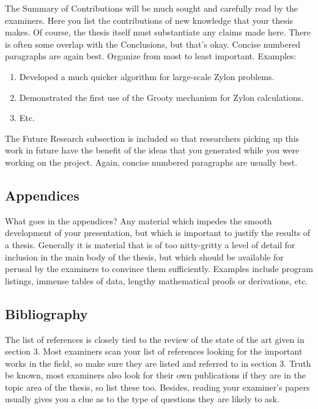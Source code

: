 The Summary of Contributions will be much sought and carefully read by the examiners. Here you list the contributions of new knowledge that your thesis makes. Of course, the thesis itself must substantiate any claims made here. There is often some overlap with the Conclusions, but that's okay. Concise numbered paragraphs are again best. Organize from most to least important. Examples:

\begin{enumerate}
	\item Developed a much quicker algorithm for large-scale Zylon problems.
	\item Demonstrated the first use of the Grooty mechanism for Zylon calculations.
	\item Etc.
\end{enumerate}

The Future Research subsection is included so that researchers picking up this work in future have the benefit of the ideas that you generated while you were working on the project. Again, concise numbered paragraphs are usually best. 

\subsection{Appendices}

What goes in the appendices? Any material which impedes the smooth development of your presentation, but which is important to justify the results of a thesis. Generally it is material that is of too nitty-gritty a level of detail for inclusion in the main body of the thesis, but which should be available for perusal by the examiners to convince them sufficiently. Examples include program listings, immense tables of data, lengthy mathematical proofs or derivations, etc. 

\subsection{Bibliography}

The list of references is closely tied to the review of the state of the art given in section 3. Most examiners scan your list of references looking for the important works in the field, so make sure they are listed and referred to in section 3. Truth be known, most examiners also look for their own publications if they are in the topic area of the thesis, so list these too. Besides, reading your examiner's papers usually gives you a clue as to the type of questions they are likely to ask.

